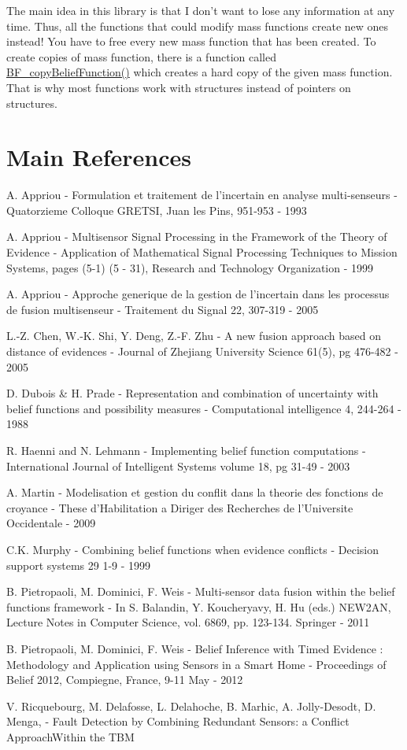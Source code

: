 The main idea in this library is that I don't want to lose any information at any time. Thus, all the functions that could modify mass functions create new ones instead! You have to free every new mass function that has been created. To create copies of mass function, there is a function called \hyperlink{_belief_functions_8c_ae248331ed725fe2bbba71abc0b397aab}{BF\_\-copyBeliefFunction()} which creates a hard copy of the given mass function. That is why most functions work with structures instead of pointers on structures.\hypertarget{index_ref_sec}{}\section{Main References}\label{index_ref_sec}
\begin{DoxyItemize}
\item A. Appriou -\/ Formulation et traitement de l'incertain en analyse multi-\/senseurs -\/ Quatorzieme Colloque GRETSI, Juan les Pins, 951-\/953 -\/ 1993 \item A. Appriou -\/ Multisensor Signal Processing in the Framework of the Theory of Evidence -\/ Application of Mathematical Signal Processing Techniques to Mission Systems, pages (5-\/1) (5 -\/ 31), Research and Technology Organization -\/ 1999 \item A. Appriou -\/ Approche generique de la gestion de l'incertain dans les processus de fusion multisenseur -\/ Traitement du Signal 22, 307-\/319 -\/ 2005 \item L.-\/Z. Chen, W.-\/K. Shi, Y. Deng, Z.-\/F. Zhu -\/ A new fusion approach based on distance of evidences -\/ Journal of Zhejiang University Science 61(5), pg 476-\/482 -\/ 2005 \item D. Dubois \& H. Prade -\/ Representation and combination of uncertainty with belief functions and possibility measures -\/ Computational intelligence 4, 244-\/264 -\/ 1988 \item R. Haenni and N. Lehmann -\/ Implementing belief function computations -\/ International Journal of Intelligent Systems volume 18, pg 31-\/49 -\/ 2003 \item A. Martin -\/ Modelisation et gestion du conflit dans la theorie des fonctions de croyance -\/ These d'Habilitation a Diriger des Recherches de l'Universite Occidentale -\/ 2009 \item C.K. Murphy -\/ Combining belief functions when evidence conflicts -\/ Decision support systems 29 1-\/9 -\/ 1999 \item B. Pietropaoli, M. Dominici, F. Weis -\/ Multi-\/sensor data fusion within the belief functions framework -\/ In S. Balandin, Y. Koucheryavy, H. Hu (eds.) NEW2AN, Lecture Notes in Computer Science, vol. 6869, pp. 123-\/134. Springer -\/ 2011 \item B. Pietropaoli, M. Dominici, F. Weis -\/ Belief Inference with Timed Evidence : Methodology and Application using Sensors in a Smart Home -\/ Proceedings of Belief 2012, Compiegne, France, 9-\/11 May -\/ 2012 \item V. Ricquebourg, M. Delafosse, L. Delahoche, B. Marhic, A. Jolly-\/Desodt, D. Menga, -\/ Fault Detection by Combining Redundant Sensors: a Conflict ApproachWithin the TBM 
\end{DoxyItemize}
